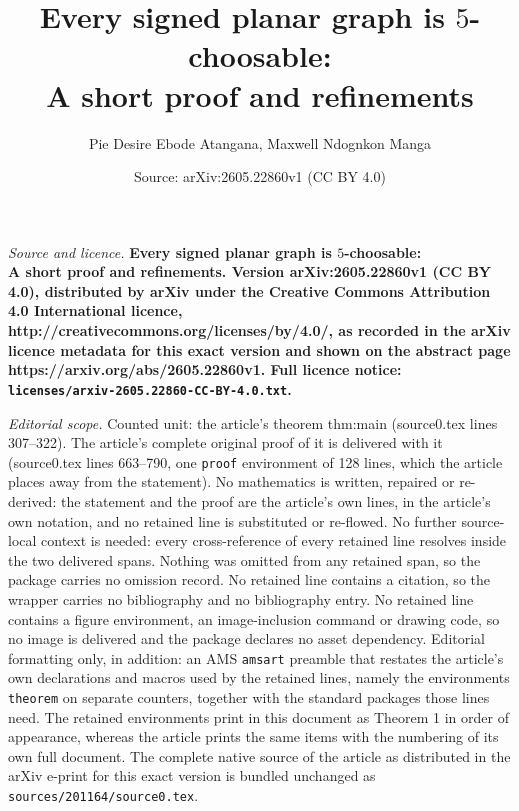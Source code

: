 \documentclass[10pt,a4paper]{amsart}
\title{\bfseries Every signed planar graph is $5$-choosable:\\ A short proof and refinements}
\author{Pie Desire Ebode Atangana, Maxwell Ndognkon Manga}
\date{Source: arXiv:2605.22860v1 (CC BY 4.0)}
\begin{document}
\maketitle

\noindent\emph{Source and licence.} \bfseries Every signed planar graph is $5$-choosable:\\ A short proof and refinements. Version arXiv:2605.22860v1 (CC BY 4.0), distributed by arXiv under the Creative Commons Attribution 4.0 International licence, http://creativecommons.org/licenses/by/4.0/, as recorded in the arXiv licence metadata for this exact version and shown on the abstract page https://arxiv.org/abs/2605.22860v1. Full licence notice: \texttt{licenses/arxiv-2605.22860-CC-BY-4.0.txt}.\par\smallskip

\noindent\textit{Editorial scope.} Counted unit: the article's theorem thm:main (source0.tex lines 307--322). The article's complete original proof of it is delivered with it (source0.tex lines 663--790, one \texttt{proof} environment of 128 lines, which the article places away from the statement). No mathematics is written, repaired or re-derived: the statement and the proof are the article's own lines, in the article's own notation, and no retained line is substituted or re-flowed.  No further source-local context is needed: every cross-reference of every retained line resolves inside the two delivered spans.  Nothing was omitted from any retained span, so the package carries no omission record.  No retained line contains a citation, so the wrapper carries no bibliography and no bibliography entry.  No retained line contains a figure environment, an image-inclusion command or drawing code, so no image is delivered and the package declares no asset dependency.  Editorial formatting only, in addition: an AMS \texttt{amsart} preamble that restates the article's own declarations and macros used by the retained lines, namely the environments \texttt{theorem} on separate counters, together with the standard packages those lines need.  The retained environments print in this document as Theorem 1 in order of appearance, whereas the article prints the same items with the numbering of its own full document.  The complete native source of the article as distributed in the arXiv e-print for this exact version is bundled unchanged as \texttt{sources/201164/source0.tex}.
\end{document}
